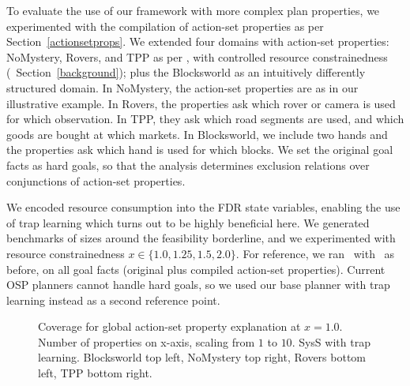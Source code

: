 To evaluate the use of our framework with more complex plan
properties, we experimented with the compilation of action-set
properties as per Section~\ref{actionsetprops}.
%
We extended four domains with action-set properties: NoMystery,
Rovers, and TPP as per \cite{nakhost:etal:icaps-12}, with controlled
resource constrainedness (\cf\ Section~\ref{background}); plus the
Blocksworld as an intuitively differently structured domain.
%
In NoMystery, the action-set properties are as in our illustrative
example. In Rovers, the properties ask which rover or camera is used
for which observation. In TPP, they ask which road segments are used,
and which goods are bought at which markets. In Blocksworld, we
include two hands and the properties ask which hand is used for which
blocks.
%
We set the original goal facts as hard goals, so that the analysis
determines exclusion relations over conjunctions of action-set
properties.

We encoded resource consumption into the FDR state variables, enabling
the use of trap learning which turns out to be highly beneficial
here. We generated benchmarks of sizes around the feasibility
borderline, and we experimented with resource constrainedness
$x \in \{1.0, 1.25, 1.5, 2.0\}$. For reference, we ran \astar\
with \hlmcut\ as before, on all goal facts (original plus compiled
action-set properties). Current OSP planners cannot handle hard goals,
so we used our base planner with trap learning instead as a second
reference point.

%
\begin{figure}[h!]
\vspace{-0.3cm}
\small
\centering


\vspace{-0.25cm}
\caption{\label{fig:asp-global} Coverage for global action-set 
property explanation at $x=1.0$.  Number of properties on x-axis,
scaling from $1$ to $10$. SysS with trap learning. Blocksworld top
left, NoMystery top right, Rovers bottom left, TPP bottom
right.}
%
%
%
\vspace{-0.3cm}
\end{figure}

